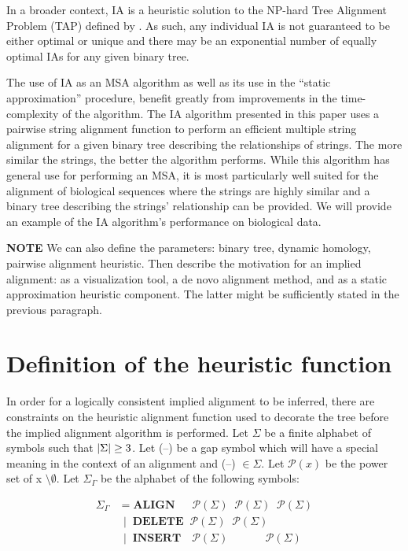 \documentclass[11pt]{article}
\DeclarePairedDelimiter\setsize{\lvert}{\rvert}%
\begin{document}
In a broader context, IA is a heuristic solution to the NP-hard Tree Alignment Problem (TAP) defined by \cite{sankoff1975}.  As such, any individual IA is not guaranteed to be either optimal or unique and there may be an exponential number of equally optimal IAs for any given binary tree.

The use of IA as an MSA algorithm as well as its use in the ``static approximation'' procedure, benefit greatly from improvements in the time-complexity of the algorithm.
The IA algorithm presented in this paper uses a pairwise string alignment function to perform an efficient multiple string alignment for a given binary tree describing the relationships of strings. 
The more similar the strings, the better the algorithm performs. 
While this algorithm has general use for performing an MSA, it is most particularly well suited for the alignment of biological sequences where the strings are highly similar and a binary tree describing the strings' relationship can be provided. 
We will provide an example of the IA algorithm's performance on biological data.

\textbf{NOTE}
We can also define the parameters: binary tree, dynamic homology, pairwise alignment heuristic. Then describe the motivation for an implied alignment: as a visualization tool, a de novo alignment method, and as a static approximation heuristic component. The latter might be sufficiently stated in the previous paragraph.

\section{Definition of the heuristic function}
In order for a logically consistent implied alignment to be inferred, there are constraints on the heuristic alignment function used to decorate the tree before the implied alignment algorithm is performed.
Let $\Sigma$ be a finite alphabet of symbols such that $\setsize{\Sigma} \geq 3$.
Let (--) be a gap symbol which will have a special meaning in the context of an alignment and (--) $\in \Sigma$.
Let $\mathcal{P}(x)$ be the power set of x $\setminus \emptyset$.
Let $\Sigma_{\Gamma}$ be the alphabet of the following symbols:

\begin{align*}
  \Sigma_{\Gamma} &      = \textbf{ALIGN}  \;\;\;\;\;\,  \mathcal{P} (\Sigma) \;\; \mathcal{P} (\Sigma) \;\; \mathcal{P} (\Sigma)
\\                & \;\, | \;\; \textbf{DELETE} \;\;     \mathcal{P} (\Sigma) \;\; \mathcal{P} (\Sigma)
\\                & \;\, | \;\; \textbf{INSERT} \;\;\;\, \mathcal{P} (\Sigma) \;\; \quad\quad\;         \;\; \mathcal{P} (\Sigma)
\end{align*}
\end{document}
